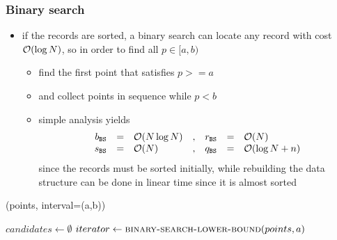 \begin{frame}[fragile]
%
  \frametitle{Binary search}
%
  \begin{itemize}
%
  \item if the records are sorted, a binary search can locate any record with cost $\mbox{$\mathcal{O}(\log
      N)$}$, so in order to find all $p \in [a,b)$
    \begin{itemize}
    \item find the first point that satisfies $p >= a$
    \item and collect points in sequence while $p < b$
    \item simple analysis yields
      \begin{equation*}
        \begin{array}{rclcrcl}
          b_{{\tt BS}} & = & \mbox{$\mathcal{O}(N \log N)$} &, &
          r_{{\tt BS}} & = & \mbox{$\mathcal{O}(N)$} \\
          s_{{\tt BS}} & = & \mbox{$\mathcal{O}(N)$} &, &
          q_{{\tt BS}} & = & \mbox{$\mathcal{O}(\log N + n)$}
        \end{array}
      \end{equation*}
      since the records must be sorted initially, while rebuilding the data structure can be
      done in linear time since it is almost sorted
    \end{itemize}
% 
  \end{itemize}
%
  \begin{center}
    \begin{minipage}{.85\linewidth}
      \begin{algorithm}[H]
        \label{alg:rq-bs}
%
        \dontprintsemicolon
        \setalcaphskip{0ex}
%
        \caption{\rqbs(points, interval=(a,b))}
        \vspace{.5em}
%
        $candidates \leftarrow \emptyset$ \;
        $iterator \leftarrow \mbox{\sc binary-search-lower-bound}(points, a)$ \;
%
      \end{algorithm}
    \end{minipage}
  \end{center}
%
\end{frame}

